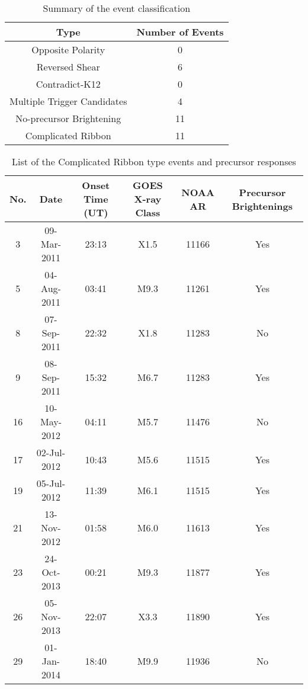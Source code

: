 \documentclass[10pt,preprint2]{aastex}
\begin{document}
\begin{table*}
\begin{center}
\begin{tabular}{|c|c|}
\hline
Type & Number of Events \\
\hline\hline
Opposite Polarity & 0 \\ \hline
Reversed Shear & 6 \\ \hline
Contradict-K12 & 0 \\ \hline
Multiple Trigger Candidates & 4 \\ \hline
No-precursor Brightening & 11 \\ \hline
Complicated Ribbon & 11 \\ \hline
\end{tabular}
\caption{Summary of the event classification}
\label{table:list_summary}
\end{center}
\end{table*}

\begin{table*}
\begin{center}
\begin{tabular}{|c||c|c|c|c|c|}
\hline
No. & Date & Onset Time (UT) & GOES X-ray Class & NOAA AR & Precursor Brightenings \tablenotemark{a} \\
\hline\hline
3 & 09-Mar-2011 & 23:13 & X1.5 & 11166 & Yes \\ \hline
5 & 04-Aug-2011 & 03:41 & M9.3 & 11261 & Yes \\ \hline
8 & 07-Sep-2011 & 22:32 & X1.8 & 11283 & No \\ \hline
9 & 08-Sep-2011 & 15:32 & M6.7 & 11283 & Yes \\ \hline
16 & 10-May-2012 & 04:11 & M5.7 & 11476 & No \\ \hline
17 & 02-Jul-2012 & 10:43 & M5.6 & 11515 & Yes \\ \hline
19 & 05-Jul-2012 & 11:39 & M6.1 & 11515& Yes \\ \hline
21 & 13-Nov-2012 & 01:58 & M6.0 & 11613 & Yes \\ \hline
23 & 24-Oct-2013 & 00:21 & M9.3 & 11877 & Yes \\ \hline
26 &05-Nov-2013 & 22:07 & X3.3 & 11890 & Yes \\ \hline
29 & 01-Jan-2014& 18:40 & M9.9 & 11936 & No \\ \hline
\end{tabular}
\caption{List of the Complicated Ribbon type events and precursor responses}
\label{table:list_typeD}
\end{center}
\end{table*}
\end{document}
